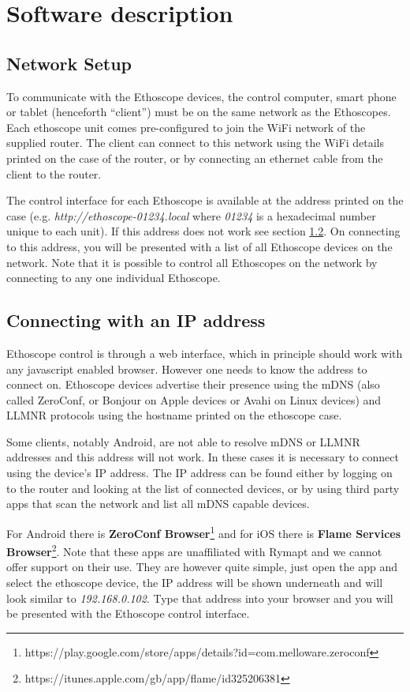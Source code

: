 \chapter{Software description}\label{ch:software}

\section{Network Setup}\label{sec:network}
To communicate with the Ethoscope devices, the control computer, smart phone or tablet (henceforth ``client'')
must be on the same network as the Ethoscopes. Each ethoscope unit comes pre-configured to join the WiFi network
of the supplied router. The client can connect to this network using the WiFi details printed on the case of
the router, or by connecting an ethernet cable from the client to the router.

The control interface for each Ethoscope is available at the address printed on the case (e.g.
\textit{http://ethoscope-01234.local} where \textit{01234} is a hexadecimal number unique to each unit). If this
address does not work see section \ref{sec:ipaddress}. On connecting to this address, you will be presented with
a list of all Ethoscope devices on the network. Note that it is possible to control all Ethoscopes on the network
by connecting to any one individual Ethoscope.

\section{Connecting with an IP address}\label{sec:ipaddress}
Ethoscope control is through a web interface, which in principle should work with any javascript enabled browser.
However one needs to know the address to connect on. Ethoscope devices advertise their presence using the mDNS
(also called ZeroConf, or Bonjour on Apple devices or Avahi on Linux devices) and LLMNR protocols using the
hostname printed on the ethoscope case.

Some clients, notably Android, are not able to resolve mDNS or LLMNR addresses and this address will not work.
In these cases it is necessary to connect using the device's IP address. The IP address can be found either
by logging on to the router and looking at the list of connected devices, or by using third party apps that
scan the network and list all mDNS capable devices.

For Android there is \textbf{ZeroConf Browser}\footnote{https://play.google.com/store/apps/details?id=com.melloware.zeroconf}
and for iOS there is \textbf{Flame Services Browser}\footnote{https://itunes.apple.com/gb/app/flame/id325206381}.
Note that these apps are unaffiliated with Rymapt and we cannot offer support on their use. They are however quite
simple, just open the app and select the ethoscope device, the IP address will be shown underneath and will look
similar to \textit{192.168.0.102}. Type that address into your browser and you will be presented with the Ethoscope
control interface.

